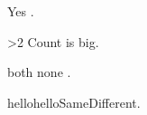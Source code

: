 \documentclass{article}
\begin{document}
\newif\iftestcond
\testcondtrue
\iftestcond Yes \else No \fi.

\setcounter{mycount}{3}
\ifnum\value{mycount}>2 Count is big\fi.

\newif\ifone \onetrue
\newif\iftwo \twotrue
\ifone \iftwo both \else first \fi \else none \fi.

\newcommand{\aaa}{hello}
\newcommand{\bbb}{hello}
\ifx\aaa\bbb Same\else Different\fi.
\end{document}
